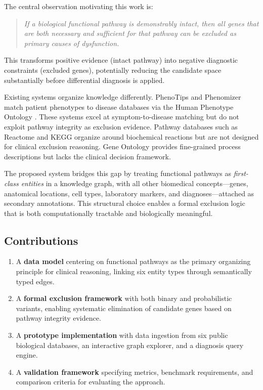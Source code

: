 \documentclass[12pt,a4paper]{article}
\begin{document}
The central observation motivating this work is:

\begin{quote}
\emph{If a biological functional pathway is demonstrably intact, then all genes that are both necessary and sufficient for that pathway can be excluded as primary causes of dysfunction.}
\end{quote}

This transforms positive evidence (intact pathway) into negative diagnostic constraints (excluded genes), potentially reducing the candidate space substantially before differential diagnosis is applied.

Existing systems organize knowledge differently. PhenoTips \citep{Girdea2013} and Phenomizer \citep{Kohler2009} match patient phenotypes to disease databases via the Human Phenotype Ontology \citep{Robinson2008}. These systems excel at symptom-to-disease matching but do not exploit pathway integrity as exclusion evidence. Pathway databases such as Reactome \citep{Fabregat2018} and KEGG \citep{Kanehisa2023} organize around biochemical reactions but are not designed for clinical exclusion reasoning. Gene Ontology \citep{Ashburner2000} provides fine-grained process descriptions but lacks the clinical decision framework.

The proposed system bridges this gap by treating functional pathways as \emph{first-class entities} in a knowledge graph, with all other biomedical concepts---genes, anatomical locations, cell types, laboratory markers, and diagnoses---attached as secondary annotations. This structural choice enables a formal exclusion logic that is both computationally tractable and biologically meaningful.

\subsection{Contributions}

\begin{enumerate}
    \item A \textbf{data model} centering on functional pathways as the primary organizing principle for clinical reasoning, linking six entity types through semantically typed edges.
    \item A \textbf{formal exclusion framework} with both binary and probabilistic variants, enabling systematic elimination of candidate genes based on pathway integrity evidence.
    \item A \textbf{prototype implementation} with data ingestion from six public biological databases, an interactive graph explorer, and a diagnosis query engine.
    \item A \textbf{validation framework} specifying metrics, benchmark requirements, and comparison criteria for evaluating the approach.
\end{enumerate}
\end{document}
